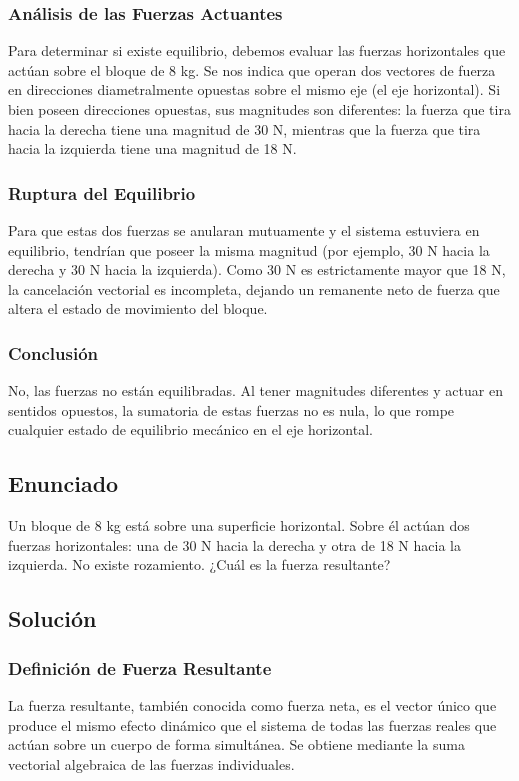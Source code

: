 \documentclass[12pt]{article}
\begin{document}
\subsubsection*{Análisis de las Fuerzas Actuantes}
Para determinar si existe equilibrio, debemos evaluar las fuerzas horizontales que actúan sobre el bloque de 8 kg. Se nos indica que operan dos vectores de fuerza en direcciones diametralmente opuestas sobre el mismo eje (el eje horizontal). Si bien poseen direcciones opuestas, sus magnitudes son diferentes: la fuerza que tira hacia la derecha tiene una magnitud de 30 N, mientras que la fuerza que tira hacia la izquierda tiene una magnitud de 18 N.

\subsubsection*{Ruptura del Equilibrio}
Para que estas dos fuerzas se anularan mutuamente y el sistema estuviera en equilibrio, tendrían que poseer la misma magnitud (por ejemplo, 30 N hacia la derecha y 30 N hacia la izquierda). Como 30 N es estrictamente mayor que 18 N, la cancelación vectorial es incompleta, dejando un remanente neto de fuerza que altera el estado de movimiento del bloque.

\subsubsection*{Conclusión}
No, las fuerzas no están equilibradas. Al tener magnitudes diferentes y actuar en sentidos opuestos, la sumatoria de estas fuerzas no es nula, lo que rompe cualquier estado de equilibrio mecánico en el eje horizontal.

\newpage

\subsection*{Enunciado}
Un bloque de 8 kg está sobre una superficie horizontal. Sobre él actúan dos fuerzas horizontales: una de 30 N hacia la derecha y otra de 18 N hacia la izquierda. No existe rozamiento. ¿Cuál es la fuerza resultante?

\subsection*{Solución}

\subsubsection*{Definición de Fuerza Resultante}
La fuerza resultante, también conocida como fuerza neta, es el vector único que produce el mismo efecto dinámico que el sistema de todas las fuerzas reales que actúan sobre un cuerpo de forma simultánea. Se obtiene mediante la suma vectorial algebraica de las fuerzas individuales.
\end{document}
